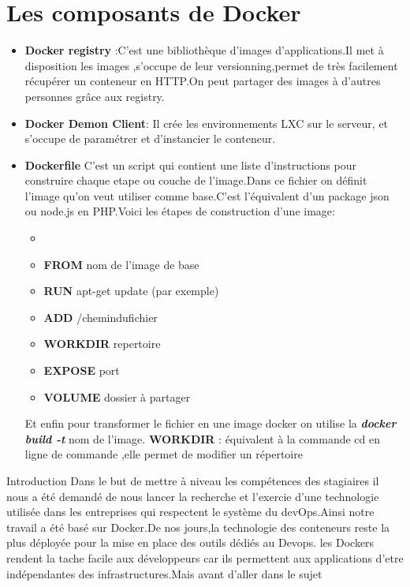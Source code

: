 \section*{Les composants de Docker}
\begin{itemize}
	\item \textbf{Docker registry} :C'est une bibliothèque d'images d'applications.Il met à disposition les images ,s'occupe de leur  versionning,permet de très facilement récupérer un conteneur en HTTP.On peut partager des images à d'autres personnes grâce aux registry.
	\item \textbf{Docker Demon Client}: Il crée les environnements LXC sur le serveur, et s’occupe de paramétrer et d’instancier le conteneur.
	\item \textbf{Dockerfile}
	C'est un script qui contient une liste d'instructions pour construire chaque etape ou couche de l’image.Dans ce fichier on définit l’image qu’on veut utiliser comme base.C’est l’équivalent d’un package json ou node.js en PHP.Voici les étapes de construction d'une image:
	\begin{itemize}
		\item
		\item\textbf{FROM} nom de l'image de base
		\item\textbf{RUN} apt-get update (par exemple)
		\item\textbf{ADD} /chemindufichier
		\item\textbf{WORKDIR} repertoire 
		\item\textbf{EXPOSE } port
		\item\textbf{VOLUME} dossier à partager
	\end{itemize}
	\vspace{0.5cm}
	Et enfin pour transformer le fichier en une image docker on utilise la  \textbf{\textit{docker build -t}} nom de l'image.
	\vspace{0.5cm}
	\textbf{WORKDIR} : équivalent à la commande cd en ligne de commande ,elle permet de modifier un répertoire
\end{itemize}
Introduction
Dans le but de mettre à niveau les compétences des stagiaires il nous a été demandé de nous lancer la recherche et l'exercie d'une technologie utilisée dans les entreprises qui respectent le système du devOps.Ainsi notre travail a été basé sur Docker.De nos jours,la technologie des conteneurs reste la plus déployée pour la mise en place des outils dédiés au Devops. les Dockers rendent  la tache facile aux développeurs car ils permettent aux applications d'etre indépendantes des infrastructures.Mais avant d'aller dans le sujet 
